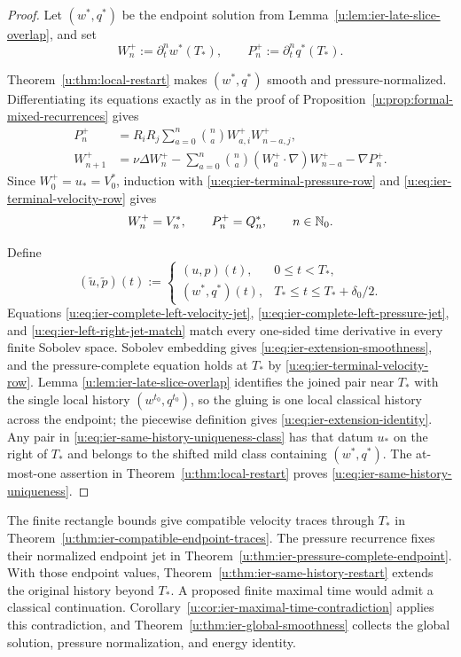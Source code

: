 \begin{proof}
Let \((w^*,q^*)\) be the endpoint solution from
Lemma~\ref{u:lem:ier-late-slice-overlap}, and set
\[
 W_n^+:=\partial_t^nw^*(T_*),
 \qquad
 P_n^+:=\partial_t^nq^*(T_*).
\]
\begin{samepage}
Theorem~\ref{u:thm:local-restart} makes \((w^*,q^*)\) smooth and
pressure-normalized.  Differentiating its equations exactly as in the proof of
Proposition~\ref{u:prop:formal-mixed-recurrences} gives
\begin{align*}
 P_n^+&=R_iR_j\sum_{a=0}^{n}\binom naW_{a,i}^+W_{n-a,j}^+,\\
 W_{n+1}^+&=\nu\Delta W_n^+
 -\sum_{a=0}^{n}\binom na(W_a^+\cdot\nabla)W_{n-a}^+
 -\nabla P_n^+.
\end{align*}
Since \(W_0^+=u_*=V_0^*\), induction with
\eqref{u:eq:ier-terminal-pressure-row} and
\eqref{u:eq:ier-terminal-velocity-row} gives
\begin{equation}
 W_n^+=V_n^*,
 \qquad P_n^+=Q_n^*,
 \qquad n\in\mathbb N_0.
 \label{u:eq:ier-left-right-jet-match}
\end{equation}
\par
\end{samepage}

Define
\[
 (\widetilde u,\widetilde p)(t)
 :=\begin{cases}
 (u,p)(t),&0\le t<T_*,\\
 (w^*,q^*)(t),&T_*\le t\le T_*+\delta_0/2.
 \end{cases}
\]
Equations \eqref{u:eq:ier-complete-left-velocity-jet},
\eqref{u:eq:ier-complete-left-pressure-jet}, and
\eqref{u:eq:ier-left-right-jet-match} match every one-sided time derivative in
every finite Sobolev space.  Sobolev embedding gives
\eqref{u:eq:ier-extension-smoothness}, and the pressure-complete equation holds
at \(T_*\) by \eqref{u:eq:ier-terminal-velocity-row}.  Lemma
\ref{u:lem:ier-late-slice-overlap} identifies the joined pair near \(T_*\) with
the single local history \((w^{t_0},q^{t_0})\), so the gluing is one local
classical history across the endpoint; the piecewise definition gives
\eqref{u:eq:ier-extension-identity}.  Any pair in
\eqref{u:eq:ier-same-history-uniqueness-class} has that datum \(u_*\) on
the right of \(T_*\) and belongs to the shifted mild class containing
\((w^*,q^*)\).  The at-most-one assertion in
Theorem~\ref{u:thm:local-restart} proves
\eqref{u:eq:ier-same-history-uniqueness}.
\end{proof}

The finite rectangle bounds give compatible velocity traces through
\(T_*\) in Theorem~\ref{u:thm:ier-compatible-endpoint-traces}.  The pressure
recurrence fixes their normalized endpoint jet in
Theorem~\ref{u:thm:ier-pressure-complete-endpoint}.  With those endpoint
values, Theorem~\ref{u:thm:ier-same-history-restart} extends the original
history beyond \(T_*\).  A proposed finite maximal time would admit a
classical continuation.  Corollary~\ref{u:cor:ier-maximal-time-contradiction}
applies this contradiction, and Theorem~\ref{u:thm:ier-global-smoothness}
collects the global solution, pressure normalization, and energy identity.

